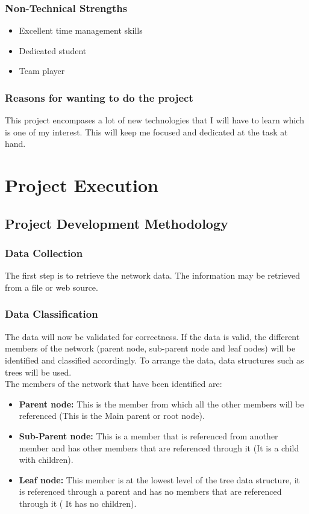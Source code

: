 \documentclass[a4paper,12pt]{article}
\begin{document}
\subsubsection{Non-Technical Strengths}
\begin{itemize}
    \item Excellent time management skills
    \item Dedicated student
    \item Team player
\end{itemize}
\subsubsection{Reasons for wanting to do the project}
This project encompases a lot of new technologies that I will have to learn which is one of my interest. This will keep me focused and dedicated at the task at hand.

\section{Project Execution}
\subsection{Project Development Methodology}
\label{Project Design Methodology}
\subsubsection{Data Collection}
The first step is to retrieve the network data. The information may be retrieved from a file or web source.
\subsubsection{Data Classification}
The data will now be validated for correctness. If the data is valid, the different members of the network (parent node, sub-parent node and leaf nodes)
will be identified and classified accordingly. To arrange the data, data structures such as trees will be used.\\
The members of the network that have been identified are:
\begin{itemize}
	\item \textbf{Parent node:} This is the member from which all the other members will be referenced (This is the Main parent or root node).
	\item \textbf{Sub-Parent node:} This is a member that is referenced from another member and has other members that are referenced through it (It is a child with children).
	\item \textbf{Leaf node:} This member is at the lowest level of the tree data structure, it is referenced through a parent and has no members that are referenced through it ( It has no children).
\end{itemize}
\newpage
\end{document}
